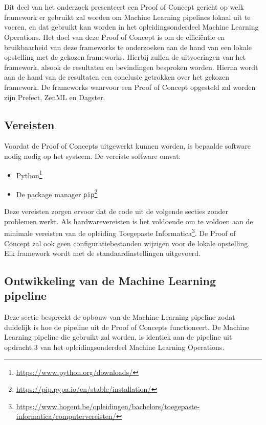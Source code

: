 \chapter{}%
\label{ch:PoC}

Dit deel van het onderzoek presenteert een Proof of Concept gericht op welk framework er gebruikt zal worden om Machine Learning pipelines lokaal uit te voeren, en dat gebruikt kan worden in het opleidingsonderdeel Machine Learning Operations.
Het doel van deze Proof of Concept is om de efficiëntie en bruikbaarheid van deze frameworks te onderzoeken aan de hand van een lokale opstelling met de gekozen frameworks. Hierbij zullen de uitvoeringen van het framework, alsook de resultaten en bevindingen besproken worden.
Hierna wordt aan de hand van de resultaten een conclusie getrokken over het gekozen framework. De frameworks waarvoor een Proof of Concept opgesteld zal worden zijn Prefect, ZenML en Dagster.

\section{Vereisten}

Voordat de Proof of Concepts uitgewerkt kunnen worden, is bepaalde software nodig nodig op het systeem. De vereiste software omvat:

\begin{itemize}
    \item Python\footnote{\url{https://www.python.org/downloads/}}
    \item De package manager \texttt{pip}\footnote{\url{https://pip.pypa.io/en/stable/installation/}}
\end{itemize}

Deze vereisten zorgen ervoor dat de code uit de volgende secties zonder problemen werkt. Als hardwarevereisten is het voldoende om te voldoen aan de minimale vereisten van de opleiding Toegepaste Informatica\footnote{\url{https://www.hogent.be/opleidingen/bachelors/toegepaste-informatica/computervereisten/}}. De Proof of Concept zal ook geen configuratiebestanden wijzigen voor de lokale opstelling. Elk framework wordt met de standaardinstellingen uitgevoerd.

\section{Ontwikkeling van de Machine Learning pipeline}

Deze sectie bespreekt de opbouw van de Machine Learning pipeline zodat duidelijk is hoe de pipeline uit de Proof of Concepts functioneert. De Machine Learning pipeline die gebruikt zal worden, is identiek aan de pipeline uit opdracht 3 van het opleidingsonderdeel Machine Learning Operations.

